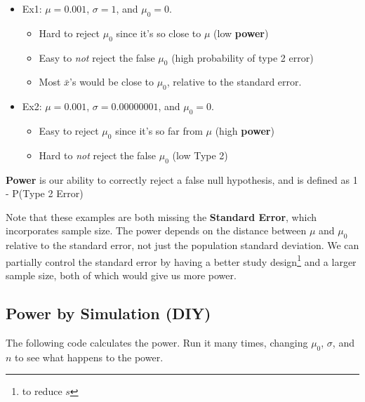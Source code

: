 \documentclass[
  letterpaper,
  DIV=11,
  numbers=noendperiod,
  oneside]{scrreprt}
\providecommand{\tightlist}{%
  \setlength{\itemsep}{0pt}\setlength{\parskip}{0pt}}\usepackage{longtable,booktabs,array}
\begin{document}
\begin{itemize}
\tightlist
\item
  Ex1: \(\mu = 0.001\), \(\sigma = 1\), and \(\mu_0 = 0\).

  \begin{itemize}
  \tightlist
  \item
    Hard to reject \(\mu_0\) since it's so close to \(\mu\) (low
    \textbf{power})
  \item
    Easy to \emph{not} reject the false \(\mu_0\) (high probability of
    type 2 error)
  \item
    Most \(\bar x\)'s would be close to \(\mu_0\), relative to the
    standard error.
  \end{itemize}
\item
  Ex2: \(\mu = 0.001\), \(\sigma = 0.00000001\), and \(\mu_0 = 0\).

  \begin{itemize}
  \tightlist
  \item
    Easy to reject \(\mu_0\) since it's so far from \(\mu\) (high
    \textbf{power})
  \item
    Hard to \emph{not} reject the false \(\mu_0\) (low Type 2)
  \end{itemize}
\end{itemize}

\textbf{Power} is our ability to correctly reject a false null
hypothesis, and is defined as 1 - P(Type 2 Error)

Note that these examples are both missing the \textbf{Standard Error},
which incorporates sample size. The power depends on the distance
between \(\mu\) and \(\mu_0\) relative to the standard error, not just
the population standard deviation. We can partially control the standard
error by having a better study design\footnote{to reduce \(s\)} and a
larger sample size, both of which would give us more power.

\hypertarget{power-by-simulation-diy}{%
\subsection{Power by Simulation (DIY)}\label{power-by-simulation-diy}}

The following code calculates the power. Run it many times, changing
\(\mu_0\), \(\sigma\), and \(n\) to see what happens to the power.
\end{document}
